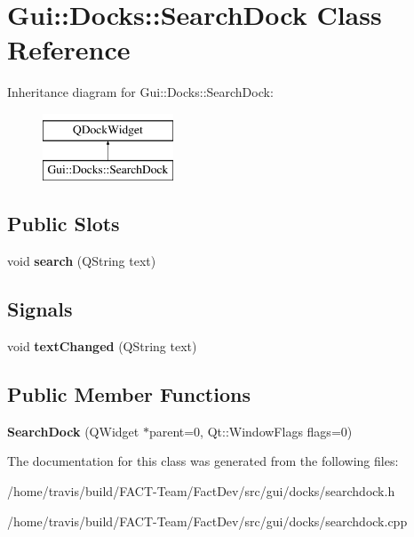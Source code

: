 \hypertarget{classGui_1_1Docks_1_1SearchDock}{\section{Gui\-:\-:Docks\-:\-:Search\-Dock Class Reference}
\label{classGui_1_1Docks_1_1SearchDock}
}
Inheritance diagram for Gui\-:\-:Docks\-:\-:Search\-Dock\-:\begin{figure}[H]
\begin{center}
\leavevmode
\includegraphics[height=2.000000cm]{de/db4/classGui_1_1Docks_1_1SearchDock}
\end{center}
\end{figure}
\subsection*{Public Slots}
\begin{DoxyCompactItemize}
\item 
\hypertarget{classGui_1_1Docks_1_1SearchDock_a7360b52fd0bc03e089049b574e509c02}{void {\bfseries search} (Q\-String text)}\label{classGui_1_1Docks_1_1SearchDock_a7360b52fd0bc03e089049b574e509c02}

\end{DoxyCompactItemize}
\subsection*{Signals}
\begin{DoxyCompactItemize}
\item 
\hypertarget{classGui_1_1Docks_1_1SearchDock_a9b33dea8adfe26b4d7a5dadffbbb07a7}{void {\bfseries text\-Changed} (Q\-String text)}\label{classGui_1_1Docks_1_1SearchDock_a9b33dea8adfe26b4d7a5dadffbbb07a7}

\end{DoxyCompactItemize}
\subsection*{Public Member Functions}
\begin{DoxyCompactItemize}
\item 
\hypertarget{classGui_1_1Docks_1_1SearchDock_adf73556520bdbc579bd7d8da31ee2042}{{\bfseries Search\-Dock} (Q\-Widget $\ast$parent=0, Qt\-::\-Window\-Flags flags=0)}\label{classGui_1_1Docks_1_1SearchDock_adf73556520bdbc579bd7d8da31ee2042}

\end{DoxyCompactItemize}


The documentation for this class was generated from the following files\-:\begin{DoxyCompactItemize}
\item 
/home/travis/build/\-F\-A\-C\-T-\/\-Team/\-Fact\-Dev/src/gui/docks/searchdock.\-h\item 
/home/travis/build/\-F\-A\-C\-T-\/\-Team/\-Fact\-Dev/src/gui/docks/searchdock.\-cpp\end{DoxyCompactItemize}
